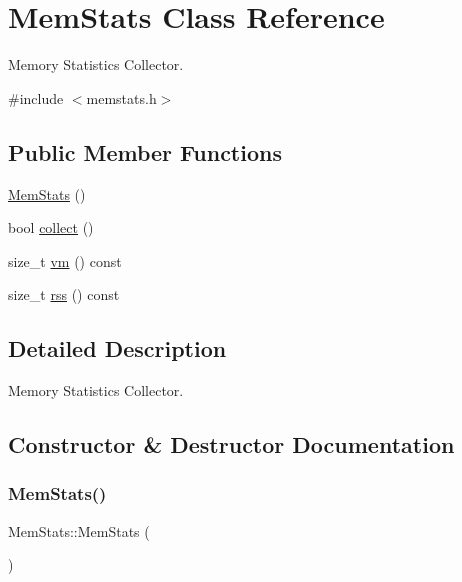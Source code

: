 \hypertarget{class_mem_stats}{}\section{Mem\+Stats Class Reference}
\label{class_mem_stats}


Memory Statistics Collector.  




{\ttfamily \#include $<$memstats.\+h$>$}

\subsection*{Public Member Functions}
\begin{DoxyCompactItemize}
\item 
\mbox{\hyperlink{class_mem_stats_a2c61e6d31b5e0d844f886e557007def8}{Mem\+Stats}} ()
\item 
bool \mbox{\hyperlink{class_mem_stats_abfdee470694d64d99dc628e5d6ac7c4d}{collect}} ()
\item 
size\+\_\+t \mbox{\hyperlink{class_mem_stats_a4b0ccd8c10a2c6c8090d168205142b26}{vm}} () const
\item 
size\+\_\+t \mbox{\hyperlink{class_mem_stats_af871da40df8d3810d331c4c550fd070b}{rss}} () const
\end{DoxyCompactItemize}


\subsection{Detailed Description}
Memory Statistics Collector. 

\subsection{Constructor \& Destructor Documentation}
\mbox{\label{class_mem_stats_a2c61e6d31b5e0d844f886e557007def8}} 
\subsubsection{\texorpdfstring{MemStats()}{MemStats()}}
{\footnotesize\ttfamily Mem\+Stats\+::\+Mem\+Stats (\begin{DoxyParamCaption}{ }\end{DoxyParamCaption})}




